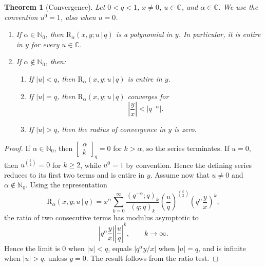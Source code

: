\documentclass[12pt]{article}
\newcommand{\rr}{\mathrm{R}}
\newtheorem{theorem}{Theorem}
\begin{document}
\begin{theorem}[Convergence]\label{conver}
Let \(0<q<1\), \(x\neq 0\), \(u\in\mathbb C\), and
\(\alpha\in\mathbb C\). We use the convention \(u^0=1\), also when
\(u=0\).

\begin{enumerate}
\item If \(\alpha\in\mathbb N_0\), then
\(\rr_{\alpha}(x,y;u\,|\,q)\) is a polynomial in \(y\). In particular,
it is entire in \(y\) for every \(u\in\mathbb C\).

\item If \(\alpha\notin\mathbb N_0\), then:
\begin{enumerate}
\item If \(|u|<q\), then \(\rr_{\alpha}(x,y;u\,|\,q)\) is entire in \(y\).
\item If \(|u|=q\), then \(\rr_{\alpha}(x,y;u\,|\,q)\) converges for
\[
\left|\frac{y}{x}\right|<|q^{-\alpha}|.
\]
\item If \(|u|>q\), then the radius of convergence in \(y\) is zero.
\end{enumerate}
\end{enumerate}
\end{theorem}
\begin{proof}
If \(\alpha\in\mathbb N_0\), then
\(\begin{bmatrix}\alpha\\ k\end{bmatrix}_q=0\) for \(k>\alpha\), so the
series terminates. If \(u=0\), then \(u^{\binom{k}{2}}=0\) for \(k\geq 2\), while \(u^0=1\) by convention. Hence the defining series reduces to its first two terms and is entire in \(y\). Assume now that \(u\neq 0\) and \(\alpha\notin\mathbb N_0\). Using the representation
\[
\rr_{\alpha}(x,y;u\,|\,q)
=
x^\alpha
\sum_{k=0}^{\infty}
\frac{(q^{-\alpha};q)_k}{(q;q)_k}
\left(\frac{u}{q}\right)^{\binom{k}{2}}
\left(q^\alpha\frac{y}{x}\right)^k,
\]
the ratio of two consecutive terms has modulus asymptotic to
\[
\left|q^\alpha\frac{y}{x}\right|
\left|\frac{u}{q}\right|^k ,
\qquad k\to\infty.
\]
Hence the limit is \(0\) when \(|u|<q\), equals
\(\left|q^\alpha y/x\right|\) when \(|u|=q\), and is infinite when
\(|u|>q\), unless \(y=0\). The result follows from the ratio test.
\end{proof}
\end{document}

